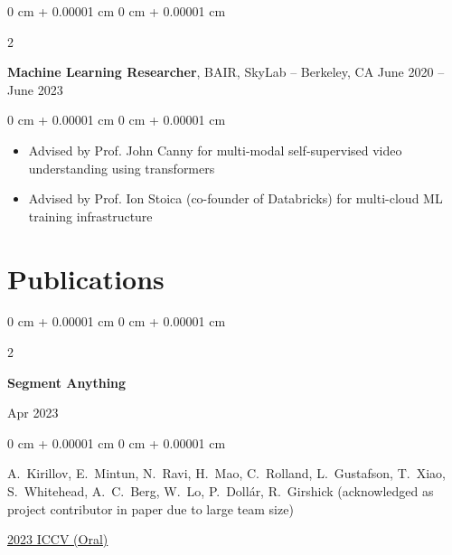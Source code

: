 \documentclass[10pt, letterpaper]{article}
\newenvironment{highlights}{
    \begin{itemize}[
        topsep=0.10 cm,
        parsep=0.10 cm,
        partopsep=0pt,
        itemsep=0pt,
        leftmargin=0 cm + 10pt
    ]
}{
    \end{itemize}
} %
\newenvironment{onecolentry}{
    \begin{adjustwidth}{
        0 cm + 0.00001 cm
    }{
        0 cm + 0.00001 cm
    }
}{
    \end{adjustwidth}
} %
\newenvironment{twocolentry}[2][]{
    \onecolentry
    \def\secondColumn{#2}
    \setcolumnwidth{\fill, 4.5 cm}
    \begin{paracol}{2}
}{
    \switchcolumn \raggedleft \secondColumn
    \end{paracol}
    \endonecolentry
} %
\begin{document}
        \vspace{0.2 cm}

        \begin{twocolentry}{
            June 2020 – June 2023
        }
            \textbf{Machine Learning Researcher}, BAIR, SkyLab -- Berkeley, CA\end{twocolentry}

        \vspace{0.10 cm}
        \begin{onecolentry}
            \begin{highlights}
                \item Advised by Prof. John Canny for multi-modal self-supervised video understanding using transformers
                \item Advised by Prof. Ion Stoica (co-founder of Databricks) for multi-cloud ML training infrastructure
            \end{highlights}
        \end{onecolentry}

    
    \section{Publications}
        \begin{samepage}
            \begin{twocolentry}{
                Apr 2023
            }
                \textbf{Segment Anything}
            \end{twocolentry}

            \vspace{0.10 cm}
            
            \begin{onecolentry}
                \mbox{A. Kirillov}, \mbox{E. Mintun}, \mbox{N. Ravi}, \mbox{H. Mao}, \mbox{C. Rolland}, \mbox{L. Gustafson}, \mbox{T. Xiao}, \mbox{S. Whitehead}, \mbox{A. C. Berg}, \mbox{W. Lo}, \mbox{P. Dollár}, \mbox{R. Girshick} (acknowledged as project contributor in paper due to large team size)
                \vspace{0.10 cm}
                
        \href{https://arxiv.org/abs/2304.02643}{2023 ICCV (Oral)}
        \end{onecolentry}
        \end{samepage}

        \vspace{0.30 cm}
\end{document}
